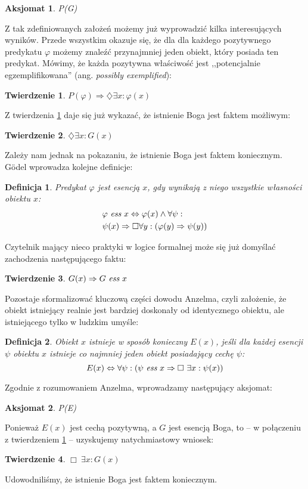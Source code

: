 \documentclass[runningheads]{llncs}
\newtheorem{theorem-pl}{Twierdzenie}
\newtheorem{definition-pl}{Definicja}
\newtheorem{axiom-pl}{Aksjomat}
\begin{document}
\begin{axiom-pl} \label{axiom:godel4}
	P(G)
\end{axiom-pl}
\noindent Z tak zdefiniowanych założeń możemy już wyprowadzić kilka interesujących wyników. Przede wszystkim okazuje się, że dla dla każdego pozytywnego predykatu $\varphi$ możemy znaleźć przynajmniej jeden obiekt, który posiada ten predykat. Mówimy, że każda pozytywna właściwość jest ,,potencjalnie egzemplifikowana'' (ang. \emph{possibly exemplified}):
\begin{theorem-pl} \label{th:godel1}
	$P(\varphi) \Rightarrow \diamondsuit \exists x: \varphi(x)$
\end{theorem-pl}
\noindent Z twierdzenia \ref{th:godel1} daje się już wykazać, że istnienie Boga jest faktem możliwym:
\begin{theorem-pl} \label{th:godel2}
	$\diamondsuit \exists x: G(x)$
\end{theorem-pl}
\noindent Zależy nam jednak na pokazaniu, że istnienie Boga jest faktem koniecznym. G\"odel wprowadza kolejne definicje:
\begin{definition-pl}
	Predykat $\varphi$ jest \emph{esencją} $x$, gdy wynikają z niego wszystkie własności obiektu $x$:
	\begin{align*}
	& \varphi\ \emph{ess}\ x \Leftrightarrow \varphi(x) \wedge \forall \psi: \\ 
	& \psi(x) \Rightarrow \Box \forall y: \left( \varphi(y) \Rightarrow \psi(y) \right)
	\end{align*}
\end{definition-pl}
\noindent Czytelnik mający nieco praktyki w logice formalnej może się już domyślać zachodzenia następującego faktu:
\begin{theorem-pl}
	$G(x) \Rightarrow G\ \emph{ess}\ x$
\end{theorem-pl}
\noindent Pozostaje sformalizować kluczową części dowodu Anzelma, czyli założenie, że obiekt istniejący realnie jest bardziej doskonały od identycznego obiektu, ale istniejącego tylko w ludzkim umyśle: 
\begin{definition-pl}
	Obiekt $x$ istnieje w sposób konieczny $E(x)$, jeśli dla każdej esencji $\psi$ obiektu $x$ istnieje co najmniej jeden obiekt posiadający cechę $\psi$:
	\begin{equation*}
	E(x) \Leftrightarrow \forall \psi: \left( \psi\ \emph{ess}\ x \Rightarrow\Box\ \exists x: \psi(x) \right)
	\end{equation*}
\end{definition-pl}
\noindent Zgodnie z rozumowaniem Anzelma, wprowadzamy następujący aksjomat:
\begin{axiom-pl}
	P(E)
\end{axiom-pl}
\noindent Ponieważ $E(x)$ jest cechą pozytywną, a $G$ jest esencją Boga, to -- w połączeniu z twierdzeniem \ref{th:godel1} -- uzyskujemy natychmiastowy wniosek:
\begin{theorem-pl} \label{th:goedel3}
	$\Box\ \exists x: G(x)$
\end{theorem-pl}
\noindent Udowodniliśmy, że istnienie Boga jest faktem koniecznym.
\end{document}
